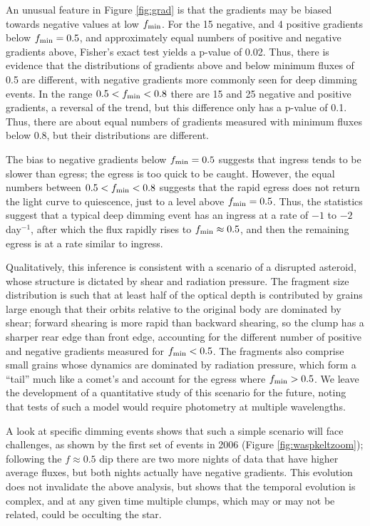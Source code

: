 \documentclass[]{rsos}
\begin{document}
An unusual feature in Figure \ref{fig:grad} is that the gradients may be biased towards
negative values at low $f_{\rm min}$. For the 15 negative, and 4 positive gradients below
$f_{\rm min}=0.5$, and approximately equal numbers of positive and negative gradients
above, Fisher's exact test yields a p-value of 0.02. Thus, there is evidence that the
distributions of gradients above and below minimum fluxes of 0.5 are different, with
negative gradients more commonly seen for deep dimming events. In the range
$0.5<f_{\rm min}<0.8$ there are 15 and 25 negative and positive gradients, a reversal of
the trend, but this difference only has a p-value of 0.1. Thus, there are about equal
numbers of gradients measured with minimum fluxes below 0.8, but their distributions are
different.

The bias to negative gradients below $f_{\rm min}=0.5$ suggests that ingress tends to be
slower than egress; the egress is too quick to be caught. However, the equal numbers
between $0.5 < f_{\rm min} < 0.8$ suggests that the rapid egress does not return the
light curve to quiescence, just to a level above $f_{\rm min}=0.5$. Thus, the statistics
suggest that a typical deep dimming event has an ingress at a rate of $-1$ to $-2$
day$^{-1}$, after which the flux rapidly rises to $f_{\rm min} \approx 0.5$, and then the
remaining egress is at a rate similar to ingress.

Qualitatively, this inference is consistent with a scenario of a disrupted asteroid,
whose structure is dictated by shear and radiation pressure. The fragment size
distribution is such that at least half of the optical depth is contributed by grains
large enough that their orbits relative to the original body are dominated by shear;
forward shearing is more rapid than backward shearing, so the clump has a sharper rear
edge than front edge, accounting for the different number of positive and negative
gradients measured for $f_{\rm min} < 0.5$. The fragments also comprise small grains
whose dynamics are dominated by radiation pressure, which form a ``tail'' much like a
comet's and account for the egress where $f_{\rm min} > 0.5$. We leave the development of
a quantitative study of this scenario for the future, noting that tests of such a model
would require photometry at multiple wavelengths.

A look at specific dimming events shows that such a simple scenario will face challenges,
as shown by the first set of events in 2006 (Figure \ref{fig:waspkeltzoom}); following
the $f \approx 0.5$ dip there are two more nights of data that have higher average
fluxes, but both nights actually have negative gradients. This evolution does not
invalidate the above analysis, but shows that the temporal evolution is complex, and at
any given time multiple clumps, which may or may not be related, could be occulting the
star.
\end{document}
